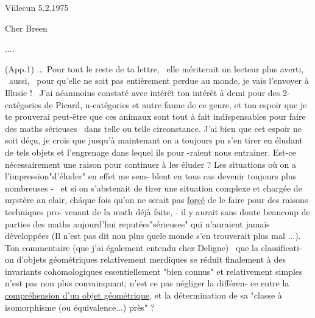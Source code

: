 
\hfill Villecun 5.2.1975\margin{--}

\margin{--} Cher Breen

\quad ....

(App.1) \quad ... Pour tout le reste de ta lettre, \ elle mériterait un lecteur
\margin{--} plus averti, \ aussi, \ pour qu'elle ne soit pas entièrement perdue au monde,
je vais l'envoyer à Illusie ! \ J'ai néanmoins
constaté\hand{,} avec intérêt\hand{,} ton intérêt à demi  pour des 2-catégories de
Picard, n-catégories et autre faune de ce genre, et ton espoir que je te
prouverai peut-être que ces animaux sont tout à fait indispensables pour
faire des maths sérieuses \ dans telle ou telle circonstance. J'ai bien 
que cet espoir ne soit déçu, je crois que jusqu'à maintenant on a toujours
pu s'en tirer en éludant de tels objets et l'engrenage dans lequel ils pour
-raient nous entrainer. Est-ce nécessairement une raison pour continuer à
les éluder ? Les situations où on a l'impression"d'éluder" en effet me sem-%
blent en tous cas devenir toujours plus nombreuses - \ et si on s'abstenait
de tirer une situation complexe et chargée de mystère au clair, ch\'aque
fois qu'on ne serait pas \uline{forcé} de le faire pour des raisons techniques pro-%
venant de la math déjà faite, - il y aurait sans doute beaucoup de parties
des maths aujourd'hui reputées\hand{|}"sérieuses" qui n'auraient jamais  développées
(Il n'est pas dit non plus que\hand{|}le monde s'en trouverait plus mal ...). Ton
commentaire (que j'ai également entendu chez Deligne) \ que la classificati-%
on d'objets géométriques relativement merdiques se réduit finalement à des
invariants cohomologiques essentiellement "bien connus" et relativement
simples n'est pas non plus convainquant; n'est ce pas négliger la différen-%
ce entre la \uline{compréhension d'un objet géométrique}, et la détermination de
sa "classe à isomorphisme (ou équivalence...) près" ?

